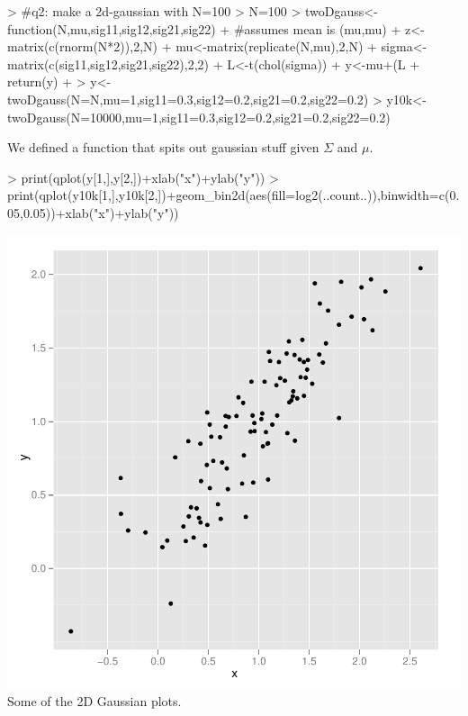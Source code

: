 \documentclass[nogin, 10pt]{article}
\begin{document}
\begin{Schunk}
\begin{Sinput}
> 	#q2: make a 2d-gaussian with N=100
> 	N=100
> 	twoDgauss<-function(N,mu,sig11,sig12,sig21,sig22){
+ 	  #assumes mean is (mu,mu)
+ 	  z<-matrix(c(rnorm(N*2)),2,N)
+ 	  mu<-matrix(replicate(N,mu),2,N)
+ 	  sigma<-matrix(c(sig11,sig12,sig21,sig22),2,2)
+ 	  L<-t(chol(sigma))
+ 	  y<-mu+(L%
+ 	  return(y)
+ 	}
> 	y<-twoDgauss(N=N,mu=1,sig11=0.3,sig12=0.2,sig21=0.2,sig22=0.2)
> 	y10k<-twoDgauss(N=10000,mu=1,sig11=0.3,sig12=0.2,sig21=0.2,sig22=0.2)
\end{Sinput}
\end{Schunk}
We defined a function that spits out gaussian stuff given $\Sigma$ and $\mu$.
\begin{Schunk}
\begin{Sinput}
> 	print(qplot(y[1,],y[2,])+xlab("x")+ylab("y"))
> 	print(qplot(y10k[1,],y10k[2,])+geom_bin2d(aes(fill=log2(..count..)),binwidth=c(0.05,0.05))+xlab("x")+ylab("y"))
\end{Sinput}
\end{Schunk}
\includegraphics{Sweave-005}
Some of the 2D Gaussian plots.
\end{document}
